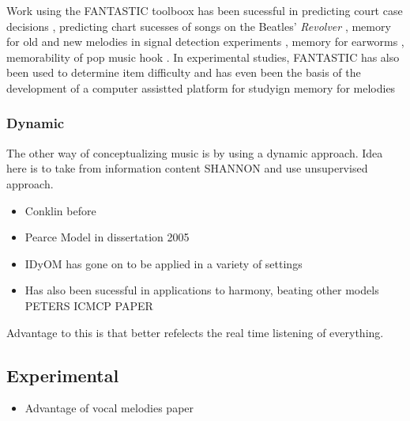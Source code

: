 \documentclass[]{book}
\providecommand{\tightlist}{%
  \setlength{\itemsep}{0pt}\setlength{\parskip}{0pt}}
\theoremstyle{definition}
\theoremstyle{definition}
\theoremstyle{definition}
\theoremstyle{remark}
\begin{document}
Work using the FANTASTIC toolboox has been sucessful in predicting court
case decisions \citep{mullensiefenCourtDecisionsMusic2009}, predicting
chart sucesses of songs on the Beatles' \emph{Revolver}
\citep{kopiezAufSucheNach2011}, memory for old and new melodies in
signal detection experiments
\citep{mullensiefenRoleFeaturesContext2014}, memory for earworms
\citep{jakubowskiDissectingEarwormMelodic2017, williamsonEarwormsThreeAngles2012},
memorability of pop music hook \citep{balenCorpusAnalyisTools2015}. In
experimental studies, FANTASTIC has also been used to determine item
difficulty
\citep{bakerPerceptionLeitmotivesRichard2017, harrisonModellingMelodicDiscrimination2016}
and has even been the basis of the development of a computer assistted
platform for studyign memory for melodies
\citep{rainsfordMUSOSMUsicSOftware2018}

\hypertarget{dynamic}{%
\subsubsection{Dynamic}\label{dynamic}}

The other way of conceptualizing music is by using a dynamic approach.
Idea here is to take from information content SHANNON and use
unsupervised approach.

\begin{itemize}
\tightlist
\item
  Conklin before
\item
  Pearce Model in dissertation 2005
\item
  IDyOM has gone on to be applied in a variety of settings
  \citep{pearceAuditoryExpectationInformation2012a, pearceStatisticalLearningProbabilistic2018}
\item
  Has also been sucessful in applications to harmony, beating other
  models PETERS ICMCP PAPER
\end{itemize}

Advantage to this is that better refelects the real time listening of
everything.

\hypertarget{experimental}{%
\subsection{Experimental}\label{experimental}}

\begin{itemize}
\tightlist
\item
  Advantage of vocal melodies paper
\end{itemize}
\end{document}
